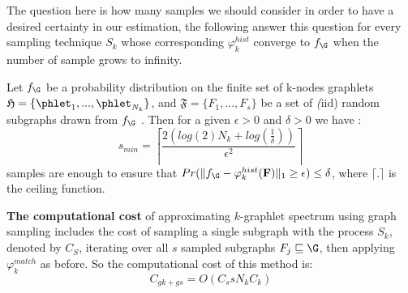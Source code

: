 The question here is how many samples we should consider in order to have a desired certainty in our estimation, the following answer this question for every sampling technique $S_k$ whose corresponding $\varphi_k^{hist}$ converge to $f_\G$ when the number of sample grows to infinity.
\begin{theorem}
Let $f_\G$ be a probability distribution on the finite set of k-nodes graphlets  $\mathfrak{H}=\{\phlet_1,...,\phlet_{N_k}\}$, and $\mathfrak{F}=\{F_1,...,F_{s}\}$ be a set of \emph(iid) random subgraphs drawn from $f_\G$  . Then for a given $\epsilon>0$ and $\delta >0$ we have \citep{graphlet_kernel}:
\begin{equation}
s_{min}=\left \lceil \frac{2(log(2)N_k+log(\frac{1}{\delta} ))}{\epsilon^2} \right \rceil
\end{equation}
samples are enough to ensure that $Pr(\| f_\G-\varphi_k^{hist}(\mathbf{F}) \|_1 \geq \epsilon )\leq\delta$, where $\lceil.\rceil$ is the ceiling function. 
\end{theorem}

\textbf{The computational cost} of approximating $k$-graphlet spectrum using graph sampling %
includes the cost of sampling a single subgraph with the process $S_k$, denoted by $C_S$, iterating over all $s$ sampled subgraphs $F_j\sqsubseteq \G$, then applying $\varphi^{match}_k$ as before. So the computational cost of this method is:
\begin{equation}
\label{eq:cost_graphlet_sampling}
    C_{gk + gs}= O(C_s s N_k C_k)
\end{equation}


